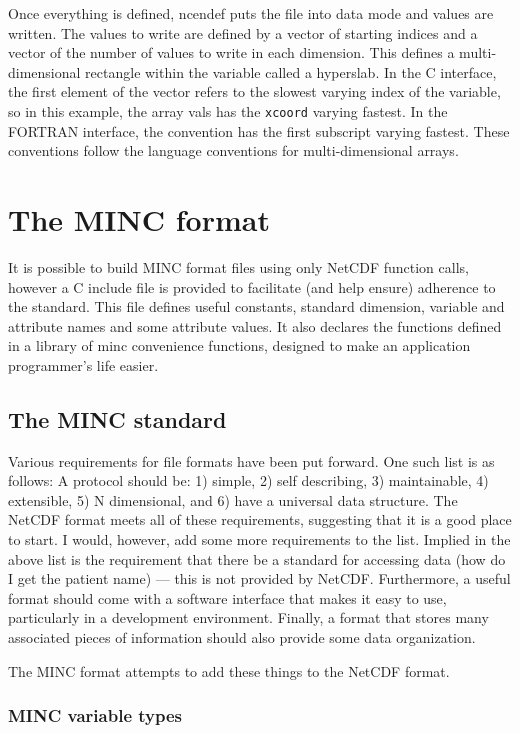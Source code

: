 Once everything is defined, ncendef puts the file into data mode and
values are written. The values to write are defined by a vector of
starting indices and a vector of the number of values to write in each
dimension. This defines a multi-dimensional rectangle within the
variable called a hyperslab. In the C interface, the first element of
the vector refers to the slowest varying index of the variable, so in
this example, the array vals has the \verb+xcoord+ varying fastest. In
the FORTRAN interface, the convention has the first subscript varying
fastest. These conventions follow the language conventions for
multi-dimensional arrays.

\section{The MINC format}

It is possible to build MINC format files using only NetCDF function
calls, however a C include file is provided to facilitate (and help
ensure) adherence to the standard. This file defines useful constants,
standard dimension, variable and attribute names and some attribute
values. It also declares the functions defined in a library of minc
convenience functions, designed to make an application programmer's
life easier.

\subsection{The MINC standard}

Various requirements for file formats have been put forward. One such
list is as follows: A protocol should be: 1) simple, 2) self
describing, 3) maintainable, 4) extensible, 5) N dimensional, and 6)
have a universal data structure. The NetCDF format meets all of these
requirements, suggesting that it is a good place to start. I would,
however, add some more requirements to the list. Implied in the above
list is the requirement that there be a standard for accessing data
(how do I get the patient name) --- this is not provided by NetCDF.
Furthermore, a useful format should come with a software interface
that makes it easy to use, particularly in a development environment.
Finally, a format that stores many associated pieces of information
should also provide some data organization.

The MINC format attempts to add these things to the NetCDF format.

\subsubsection{MINC variable types}

